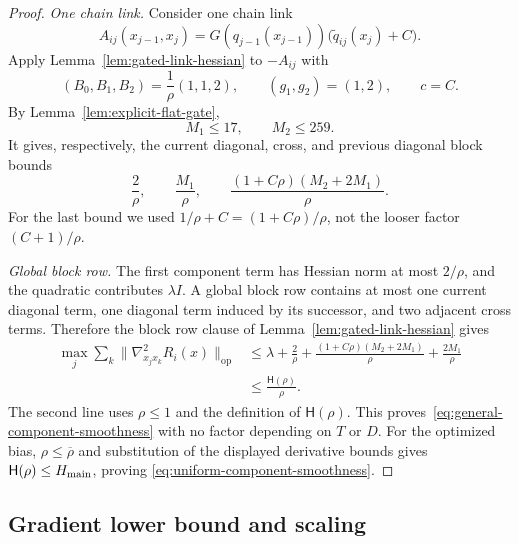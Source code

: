 \documentclass{article}
\theoremstyle{definition}
\newcommand{\op}{\mathrm{op}}
\begin{document}
\begin{proof}
\emph{One chain link.}
Consider one chain link
\begin{equation}
 A_{ij}(x_{j-1},x_j)
 =G(q_{j-1}(x_{j-1}))
 \bigl(\widetilde q_{ij}(x_j)+C\bigr).
\end{equation}
Apply Lemma~\ref{lem:gated-link-hessian} to $-A_{ij}$ with
\begin{equation}
 (B_0,B_1,B_2)=\frac1\rho(1,1,2),
 \qquad (g_1,g_2)=(1,2),
 \qquad c=C.
\end{equation}
By Lemma~\ref{lem:explicit-flat-gate},
\begin{equation}
 M_1\le17,
 \qquad
 M_2\le259.
 \label{eq:nonconvex-local-gate-derivatives}
\end{equation}
It gives, respectively, the current diagonal, cross, and previous diagonal
block bounds
\begin{equation}
 \frac2\rho,
 \qquad
 \frac{M_1}\rho,
 \qquad
 \frac{(1+C\rho)(M_2+2M_1)}\rho.
 \label{eq:uniform-link-hessian-bounds}
\end{equation}
For the last bound we used
$1/\rho+C=(1+C\rho)/\rho$, not the looser factor $(C+1)/\rho$.

\emph{Global block row.}
The first component term has Hessian norm at most $2/\rho$, and the
quadratic contributes $\lambda I$.  A global block row contains at most one
current diagonal term, one diagonal term induced by its successor, and two adjacent
cross terms.  Therefore the block row clause of
Lemma~\ref{lem:gated-link-hessian} gives
\begin{equation}
\begin{aligned}
 \max_j\sum_k\|\nabla^2_{x_jx_k}R_i(x)\|_{\op}
 &\le \lambda+\frac2\rho
 +\frac{(1+C\rho)(M_2+2M_1)}\rho
 +\frac{2M_1}\rho\\
 &\le\frac{\mathsf H(\rho)}{\rho}.
\end{aligned}
\end{equation}
The second line uses $\rho\le1$ and the definition of $\mathsf H(\rho)$.
This proves~\eqref{eq:general-component-smoothness} with no factor
depending on $T$ or $D$.  For the optimized bias,
$\rho\le\overline\rho$ and substitution of the displayed derivative bounds
gives $\mathsf H(\rho)\le H_{\rm main}$, proving
\eqref{eq:uniform-component-smoothness}.
\end{proof}

\subsection{Gradient lower bound and scaling}
\end{document}
